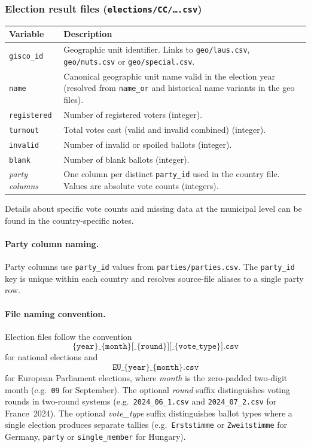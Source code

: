 \subsubsection{Election result files (\texttt{elections/CC/\ldots.csv})}
\label{sec:variables_election_files}

\begin{longtable}{p{3cm}p{12cm}}
\toprule
\textbf{Variable} & \textbf{Description} \\
\midrule
\endhead
\texttt{gisco\_id}      & Geographic unit identifier.  Links to
                          \texttt{geo/laus.csv}, \texttt{geo/nuts.csv} or
                          \texttt{geo/special.csv}. \\
\texttt{name}           & Canonical geographic unit name valid in the
                          election year (resolved from \texttt{name\_or}
                          and historical name variants in the geo files). \\
\texttt{registered}     & Number of registered voters (integer). \\
\texttt{turnout}        & Total votes cast (valid and invalid combined) (integer). \\
\texttt{invalid}        & Number of invalid or spoiled ballots (integer). \\
\texttt{blank}          & Number of blank ballots (integer). \\
\textit{party columns}  & One column per distinct \texttt{party\_id} used in
                          the country file.
                          Values are absolute vote counts (integers). \\
\bottomrule
\end{longtable}

Details about specific vote counts and missing data at the municipal level
can be found in the country-specific notes.

\paragraph{Party column naming.}
Party columns use \texttt{party\_id} values from
\texttt{parties/parties.csv}.  The \texttt{party\_id} key is unique within
each country and resolves source-file aliases to a single party row.

\paragraph{File naming convention.}
Election files follow the convention
$$\texttt{\{year\}\_\{month\}[\_\{round\}][\_\{vote\_type\}].csv}$$
for national elections and
$$\texttt{EU\_\{year\}\_\{month\}.csv}$$
for European Parliament elections, where \textit{month} is the zero-padded
two-digit month (e.g.\ \texttt{09} for September).
The optional \textit{round} suffix distinguishes voting rounds in two-round
systems (e.g.\ \texttt{2024\_06\_1.csv} and \texttt{2024\_07\_2.csv} for
France~2024).
The optional \textit{vote\_type} suffix distinguishes ballot types where a
single election produces separate tallies (e.g.\
\texttt{Erststimme} or \texttt{Zweitstimme} for Germany,
\texttt{party} or \texttt{single\_member} for Hungary).

